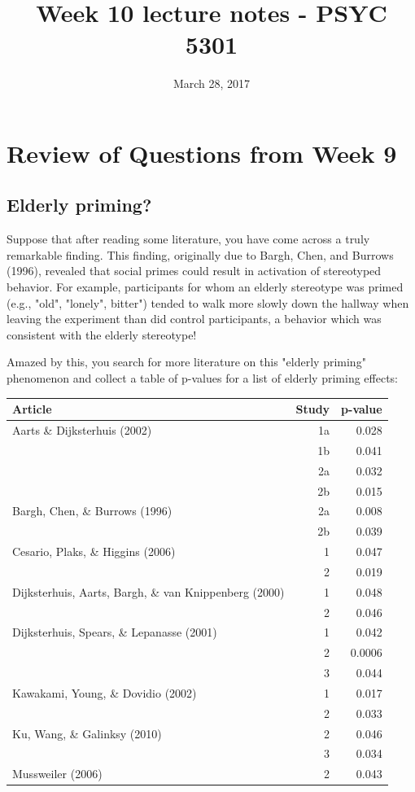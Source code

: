 \documentclass[11pt]{article}
\date{March 28, 2017}
\title{Week 10 lecture notes - PSYC 5301}
\begin{document}
\maketitle

\section*{Review of Questions from  Week 9}
\label{sec-1}
\subsection*{Elderly priming?}
\label{sec-1-1}
Suppose that after reading some literature, you have come across a truly remarkable finding.  This finding, originally due to Bargh, Chen, and Burrows (1996), revealed that social primes could result in activation of stereotyped behavior.  For example, participants for whom an elderly stereotype was primed (e.g., "old", "lonely", bitter") tended to walk more slowly down the hallway when leaving the experiment than did control participants, a behavior which was consistent with the elderly stereotype!

Amazed by this, you search for more literature on this "elderly priming" phenomenon and collect a table of p-values for a list of elderly priming effects:

\begin{center}
\begin{tabular}{lrr}
Article & Study & p-value\\
\hline
Aarts \& Dijksterhuis (2002) & 1a & 0.028\\
 & 1b & 0.041\\
 & 2a & 0.032\\
 & 2b & 0.015\\
Bargh, Chen, \& Burrows (1996) & 2a & 0.008\\
 & 2b & 0.039\\
Cesario, Plaks, \& Higgins (2006) & 1 & 0.047\\
 & 2 & 0.019\\
Dijksterhuis, Aarts, Bargh, \& van Knippenberg (2000) & 1 & 0.048\\
 & 2 & 0.046\\
Dijksterhuis, Spears, \& Lepanasse (2001) & 1 & 0.042\\
 & 2 & 0.0006\\
 & 3 & 0.044\\
Kawakami, Young, \& Dovidio (2002) & 1 & 0.017\\
 & 2 & 0.033\\
Ku, Wang, \& Galinksy (2010) & 2 & 0.046\\
 & 3 & 0.034\\
Mussweiler (2006) & 2 & 0.043\\
\end{tabular}
\end{center}
\end{document}
